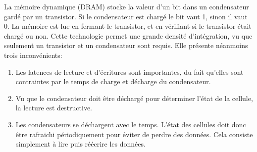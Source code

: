 La mémoire dynamique (DRAM) stocke la valeur d'un bit dans un condensateur gardé par un transistor.
Si le condensateur est chargé le bit vaut 1, sinon il vaut 0.
La mémoire est lue en fermant le transistor, et en vérifiant si le transistor était chargé ou non.
Cette technologie permet une grande densité d'intégration, vu que seulement un transistor et un condensateur sont requis.
Elle présente néanmoins trois inconvénients:
\begin{enumerate}
	\item Les latences de lecture et d'écritures sont importantes, du fait qu'elles sont contraintes par le temps de charge et décharge du condensateur.
	\item Vu que le condensateur doit être déchargé pour déterminer l'état de la cellule, la lecture est destructive.
	\item Les condensateurs se déchargent avec le temps. 
	L'état des cellules doit donc être rafraichi périodiquement pour éviter de perdre des données.
	Cela consiste simplement à lire puis réécrire les données.
\end{enumerate}

